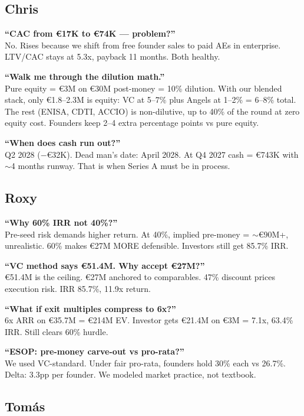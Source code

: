 \documentclass[11pt,a4paper]{article}
\begin{document}
\subsection{Chris}

\textbf{``CAC from \euro{}17K to \euro{}74K --- problem?''}\\
No. Rises because we shift from free founder sales to paid AEs in enterprise. LTV/CAC stays at 5.3x, payback 11 months. Both healthy.

\textbf{``Walk me through the dilution math.''}\\
Pure equity = \euro{}3M on \euro{}30M post-money = 10\% dilution. With our blended stack, only \euro{}1.8--2.3M is equity: VC at 5--7\% plus Angels at 1--2\% = 6--8\% total. The rest (ENISA, CDTI, ACCIO) is non-dilutive, up to 40\% of the round at zero equity cost. Founders keep 2--4 extra percentage points vs pure equity.

\textbf{``When does cash run out?''}\\
Q2 2028 ($-$\euro{}32K). Dead man's date: April 2028. At Q4 2027 cash = \euro{}743K with $\sim$4 months runway. That is when Series A must be in process.

\subsection{Roxy}

\textbf{``Why 60\% IRR not 40\%?''}\\
Pre-seed risk demands higher return. At 40\%, implied pre-money = $\sim$\euro{}90M+, unrealistic. 60\% makes \euro{}27M MORE defensible. Investors still get 85.7\% IRR.

\textbf{``VC method says \euro{}51.4M. Why accept \euro{}27M?''}\\
\euro{}51.4M is the ceiling. \euro{}27M anchored to comparables. 47\% discount prices execution risk. IRR 85.7\%, 11.9x return.

\textbf{``What if exit multiples compress to 6x?''}\\
6x ARR on \euro{}35.7M = \euro{}214M EV. Investor gets \euro{}21.4M on \euro{}3M = 7.1x, 63.4\% IRR. Still clears 60\% hurdle.

\textbf{``ESOP: pre-money carve-out vs pro-rata?''}\\
We used VC-standard. Under fair pro-rata, founders hold 30\% each vs 26.7\%. Delta: 3.3pp per founder. We modeled market practice, not textbook.

\subsection{Tom\'{a}s}
\end{document}
